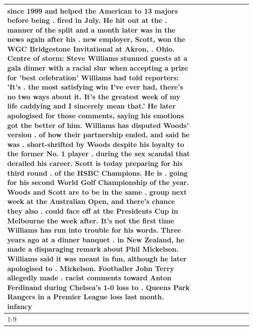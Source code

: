 \begin{table}[H]
\begin{tabular}{lllrlllll}
since 1999 and helped the American to 13 majors before being . fired in July. He hit out at the . manner of the split and a month later was in the news again after his . new employer, Scott, won the WGC Bridgestone Invitational at Akron, . Ohio. Centre of storm: Steve Williams stunned guests at a gala dinner with a racial slur when accepting a prize for 'best celebration' Williams had told reporters: 'It's . the most satisfying win I've ever had, there's no two ways about it. It's the greatest week of my life caddying and I sincerely mean that.' He later apologised for those comments, saying his emotions got the better of him. Williams has disputed Woods' version . of how their partnership ended, and said he was . short-shrifted by Woods despite his loyalty to the former No. 1 player . during the sex scandal that derailed his career. Scott is today preparing for his third round . of the HSBC Champions. He is . going for his second World Golf Championship of the year. Woods and Scott are to be in the same . group next week at the Australian Open, and there's chance they also . could face off at the Presidents Cup in Melbourne the week after. It's not the first time Williams has run into trouble for his words. Three years ago at a dinner banquet . in New Zealand, he made a disparaging remark about Phil Mickelson. Williams said it was meant in fun, although he later apologised to . Mickelson. Footballer John Terry allegedly made . racist comments toward Anton Ferdinand during Chelsea's 1-0 loss to . Queens Park Rangers in a Premier League loss last month. infancy \\
\cline{1-9}

\end{tabular}
\end{table}
